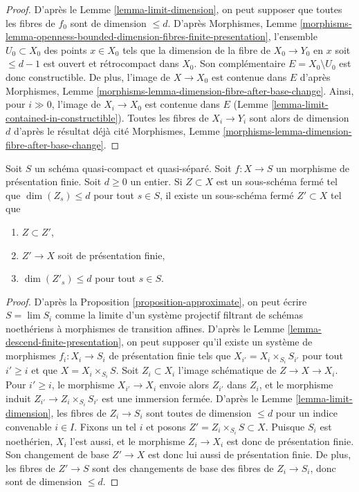 \begin{proof}
D'après le Lemme \ref{lemma-limit-dimension}, on peut supposer que toutes les fibres
de $f_0$ sont de dimension $\leq d$. D'après Morphismes, Lemme
\ref{morphisms-lemma-openness-bounded-dimension-fibres-finite-presentation},
l'ensemble $U_0 \subset X_0$ des points $x \in X_0$ tels que
la dimension de la fibre de $X_0 \to Y_0$ en $x$ soit $\leq d - 1$
est ouvert et rétrocompact dans $X_0$. Son complémentaire
$E = X_0 \setminus U_0$ est donc constructible.
De plus, l'image de $X \to X_0$ est contenue dans $E$
d'après Morphismes, Lemme \ref{morphisms-lemma-dimension-fibre-after-base-change}.
Ainsi, pour $i \gg 0$, l'image
de $X_i \to X_0$ est contenue dans $E$
(Lemme \ref{lemma-limit-contained-in-constructible}). Toutes les fibres
de $X_i \to Y_i$ sont alors de dimension $d$ d'après le résultat déjà cité
Morphismes, Lemme \ref{morphisms-lemma-dimension-fibre-after-base-change}.
\end{proof}

\begin{lemma}
\label{lemma-approximate-given-relative-dimension}
Soit $S$ un schéma quasi-compact et quasi-séparé.
Soit $f : X \to S$ un morphisme de présentation finie.
Soit $d \geq 0$ un entier.
Si $Z \subset X$ est un sous-schéma fermé tel que
$\dim(Z_s) \leq d$ pour tout $s \in S$, il existe un
sous-schéma fermé $Z' \subset X$ tel que
\begin{enumerate}
\item $Z \subset Z'$,
\item $Z' \to X$ soit de présentation finie,
\item $\dim(Z'_s) \leq d$ pour tout $s \in S$.
\end{enumerate}
\end{lemma}

\begin{proof}
D'après la
Proposition \ref{proposition-approximate},
on peut écrire $S = \lim S_i$ comme la limite d'un système projectif
filtrant de schémas noethériens à morphismes de transition affines. D'après le
Lemme \ref{lemma-descend-finite-presentation},
on peut supposer qu'il existe un système de morphismes
$f_i : X_i \to S_i$ de présentation finie tels que
$X_{i'} = X_i \times_{S_i} S_{i'}$
pour tout $i' \geq i$ et que $X = X_i \times_{S_i} S$.
Soit $Z_i \subset X_i$ l'image schématique de
$Z \to X \to X_i$. Pour $i' \geq i$, le morphisme $X_{i'} \to X_i$
envoie alors $Z_{i'}$ dans $Z_i$, et le morphisme induit
$Z_{i'} \to Z_i \times_{S_i} S_{i'}$ est une immersion fermée. D'après le
Lemme \ref{lemma-limit-dimension},
les fibres de $Z_i \to S_i$
sont toutes de dimension $\leq d$ pour un indice convenable $i \in I$.
Fixons un tel $i$ et posons $Z' = Z_i \times_{S_i} S \subset X$.
Puisque $S_i$ est noethérien, $X_i$ l'est aussi, et
le morphisme $Z_i \to X_i$ est donc de présentation finie.
Son changement de base $Z' \to X$ est donc lui aussi de présentation finie.
De plus, les fibres de $Z' \to S$ sont des changements de base des fibres
de $Z_i \to S_i$, donc sont de dimension $\leq d$.
\end{proof}






